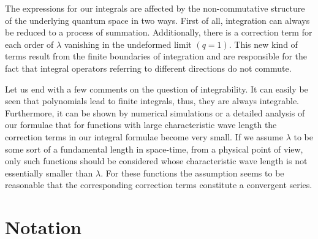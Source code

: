 \documentclass[a4paper,11pt,oneside]{article}
\begin{document}
The expressions for our integrals are affected by the non-commutative
structure of the underlying quantum space in two ways. First of all,
integration can always be reduced to a process of summation. Additionally,
there is a correction term for each order of $\lambda $ vanishing in the
undeformed limit $(q=1).$ This new kind of terms result from the finite
boundaries of integration and are responsible for the fact that integral
operators referring to different directions do not commute.

Let us end with a few comments on the question of integrability. It can
easily be seen that polynomials lead to finite integrals, thus, they are
always integrable. Furthermore, it can be shown by numerical simulations or
a detailed analysis of our formulae that for functions with large 
characteristic wave length the correction
terms in our integral formulae become very small. If we assume $\lambda $
to be some sort of a fundamental length in space-time, from a physical point
of view, only such functions should be considered whose characteristic
wave length is not essentially smaller than $\lambda $. For these functions
the assumption seems to be reasonable that the corresponding correction
terms constitute a convergent series.

\appendix 

\section{Notation\label{AppA}}
\end{document}
